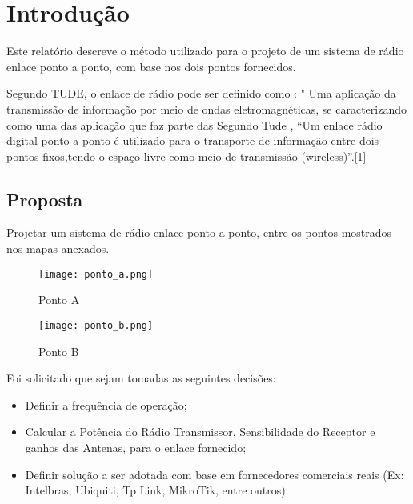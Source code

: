 
\chapter*[Introdução]{Introdução}

Este relatório descreve o método utilizado para o projeto de um sistema de rádio enlace ponto a ponto, com base nos dois pontos fornecidos.

Segundo TUDE, o enlace de rádio pode ser definido como : "
Uma aplicação da transmissão de informação por meio de ondas eletromagnéticas, se caracterizando como uma das aplicação que faz parte das Segundo Tude , “Um enlace rádio digital ponto a ponto é utilizado para o transporte de informação entre dois pontos fixos,tendo o espaço livre como meio de transmissão (wireless)”.[1]


\section*{Proposta}\label{sec:motivacao}

Projetar um sistema de rádio enlace ponto a ponto, entre os pontos mostrados nos mapas anexados.
\begin{figure}[!htb]
	\begin{minipage}{0.48\textwidth}
		\centering
		\texttt{[image: ponto\_a.png]}
		\caption{Ponto A}\label{Fig:ponto_a_intro}
	\end{minipage}\hfill
	\begin{minipage}{0.48\textwidth}
		\centering
		\texttt{[image: ponto\_b.png]}
		\caption{Ponto B}\label{Fig:ponto_b_intro}
	\end{minipage}
\end{figure}

Foi solicitado que sejam tomadas as seguintes decisões:

\begin{itemize}
\item Definir a frequência de operação;
\item Calcular a Potência do Rádio Transmissor, Sensibilidade do Receptor e ganhos das Antenas, para o enlace fornecido;
\item Definir solução a ser adotada com base em fornecedores comerciais reais (Ex:
Intelbras, Ubiquiti, Tp Link, MikroTik, entre outros)
\end{itemize}

